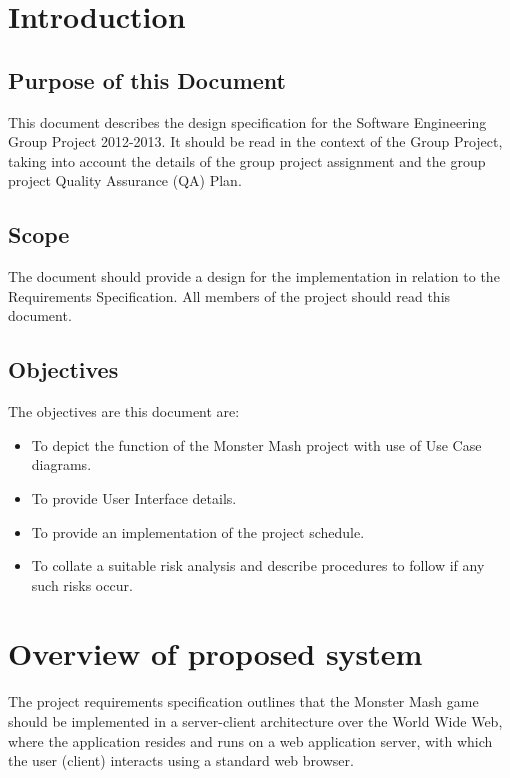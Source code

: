 \documentclass[a4paper]{article}
\begin{document}

\tableofcontents
\clearpage


\section{Introduction}

\subsection{Purpose of this Document}

This document describes the design specification for the Software Engineering Group Project 2012-2013. It should be read in the context of the Group Project, taking into account the details of the group project assignment and the group project Quality Assurance (QA) Plan.

\subsection{Scope}

The document should provide a design for the implementation in relation to the Requirements Specification. All members of the project should read this document.

\subsection{Objectives}

The objectives are this document are:

\begin{itemize}
\item To depict the function of the Monster Mash project with use of Use Case diagrams.
\item To provide User Interface details.
\item To provide an implementation of the project schedule.
\item To collate a suitable risk analysis and describe procedures to follow if any such risks occur.
\end{itemize}
\clearpage


\section{Overview of proposed system}

The project requirements specification outlines that the Monster Mash game should be implemented in a server-client architecture over the World Wide Web, where the application resides and runs on a web application server, with which the user (client) interacts using a standard web browser.\\
\end{document}
